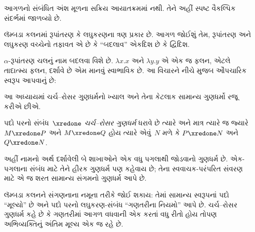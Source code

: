 \OLEndChapterHook


\begin{editorial}
આગળનો સંબંધિત અંશ મૂળના સક્રિય આયાતક્રમમાં નથી. તેને અહીં સ્પષ્ટ વૈકલ્પિક સંદર્ભમાં જાળવ્યો છે.
\end{editorial}
\begingroup
\makeatletter{}\makeatother

\label{guunit:OLP-0651}


લૅમ્બડા કલનમાં રૂપાંતરણ કે લઘુકરણના ત્રણ
પ્રકાર છે. આગળ જોઈશું તેમ, રૂપાંતરણ અને
લઘુકરણ વચ્ચેનો તફાવત એ છે કે
``બદલાવ'' એકદિશ છે કે દ્વિદિશ.

$\alpha$-રૂપાંતરણ ચલનું નામ બદલવા વિશે છે.
$\lambda x. x$ અને $\lambda y.y$ એ એક
જ ફલન, એટલે તાદાત્મ્ય ફલન, દર્શાવે છે એમ
માનવું સ્વાભાવિક છે. આ વિચારને નીચે મુજબ
ઔપચારિક સ્વરૂપ આપવાનું છે:
\endgroup
\endgroup


\begingroup
\makeatletter{}\makeatother

\label{guunit:OLP-0367}


\begingroup
\makeatletter{}\makeatother


\label{guunit:OLP-0368}


આ અધ્યાયમાં ચર્ચ--રોસર ગુણધર્મનો ખ્યાલ અને તેના
કેટલાક સામાન્ય ગુણધર્મો રજૂ કરીએ છીએ.

\begin{defn}[ચર્ચ--રોસર ગુણધર્મ, CR]
  પદો પરનો સંબંધ~$\xredone$ \emph{ચર્ચ--રોસર ગુણધર્મ}
  ધરાવે છે ત્યારે અને માત્ર ત્યારે જ જ્યારે
  $M \xredone P$ અને $M \xredone Q$ હોય ત્યારે
  એવું~$N$ મળે કે $P \xredone N$ અને
  $Q \xredone N$.
\end{defn}

અહીં નામનો અર્થ દર્શાવેલી બે શાખાઓને એક વધુ પગલાથી
જોડવાનો ગુણધર્મ છે. એક-પગલાના સંબંધ માટે તેને હીરક
ગુણધર્મ પણ કહેવાય છે; તેના સ્વવાચક-પરંપરિત સંવરણ માટે
એ જ શરત સામાન્ય સંગમનો ગુણધર્મ આપે છે.

લૅમ્બડા કલનને સંગણનાના નમૂના તરીકે જોઈ શકાય: તેમાં
સામાન્ય સ્વરૂપનાં પદો ``મૂલ્યો'' છે અને પદો પરનો
લઘુકરણ-સંબંધ ``ગણતરીના નિયમો'' આપે છે. ચર્ચ--રોસર
ગુણધર્મ કહે છે કે ગણતરીમાં આગળ વધવાની એક કરતાં વધુ
રીતો હોય તોપણ અભિવ્યક્તિનું અંતિમ મૂલ્ય એક જ રહે છે.

